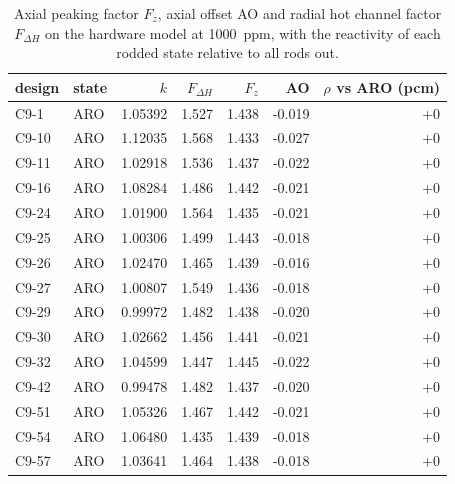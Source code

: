 \begin{table}[htbp]
  \centering
  \caption{Axial peaking factor $F_z$, axial offset AO and radial hot channel factor $F_{\Delta H}$ on the hardware model at \SI{1000}{ppm}, with the reactivity of each rodded state relative to all rods out.}
  \label{tab:c9-axial}
  \begin{tabular}{llrrrrr}
    \toprule
    design & state & $k$ & $F_{\Delta H}$ & $F_z$ & AO & $\rho$ vs ARO (pcm) \\
    \midrule
    C9-1 & ARO & 1.05392 & 1.527 & 1.438 & -0.019 & +0 \\
    C9-10 & ARO & 1.12035 & 1.568 & 1.433 & -0.027 & +0 \\
    C9-11 & ARO & 1.02918 & 1.536 & 1.437 & -0.022 & +0 \\
    C9-16 & ARO & 1.08284 & 1.486 & 1.442 & -0.021 & +0 \\
    C9-24 & ARO & 1.01900 & 1.564 & 1.435 & -0.021 & +0 \\
    C9-25 & ARO & 1.00306 & 1.499 & 1.443 & -0.018 & +0 \\
    C9-26 & ARO & 1.02470 & 1.465 & 1.439 & -0.016 & +0 \\
    C9-27 & ARO & 1.00807 & 1.549 & 1.436 & -0.018 & +0 \\
    C9-29 & ARO & 0.99972 & 1.482 & 1.438 & -0.020 & +0 \\
    C9-30 & ARO & 1.02662 & 1.456 & 1.441 & -0.021 & +0 \\
    C9-32 & ARO & 1.04599 & 1.447 & 1.445 & -0.022 & +0 \\
    C9-42 & ARO & 0.99478 & 1.482 & 1.437 & -0.020 & +0 \\
    C9-51 & ARO & 1.05326 & 1.467 & 1.442 & -0.021 & +0 \\
    C9-54 & ARO & 1.06480 & 1.435 & 1.439 & -0.018 & +0 \\
    C9-57 & ARO & 1.03641 & 1.464 & 1.438 & -0.018 & +0 \\
    \bottomrule
  \end{tabular}
\end{table}
